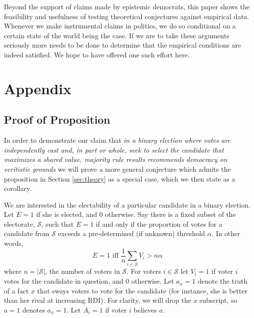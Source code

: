 \documentclass[11pt]{article}
\begin{document}
Beyond the support of claims made by epistemic democrats, this paper shows the feasibility and usefulness of testing theoretical conjectures against empirical data. Whenever we make instrumental claims in politics, we do so conditional on a certain state of the world being the case. If we are to take these arguments seriously more needs to be done to determine that the empirical conditions are indeed satisfied. We hope to have offered one such effort here.



\section{Appendix}
\subsection{Proof of Proposition}


In order to demonstrate our claim that \emph{in a binary election where votes are independently cast and, in part or whole, seek to select the candidate that maximizes a shared value, majority rule results recommends democracy on veritistic grounds} 
we will prove a more general conjecture which admits the proposition in Section \ref{sec:theory} as a special case, which we then state as a corollary. 

We are interested in the electability of a particular candidate in a binary election. Let $E=1$ if she is elected, and 0 otherwise.
Say there is a fixed subset of the electorate, $\mathcal{S}$, such that $E=1$ if and only if the proportion of votes for a candidate from $\mathcal{S}$ exceeds a pre-determined (if unknown) threshold $\alpha$. In other words,
\begin{equation}
E =1 \text{ iff } \frac{1}{n} \sum_{i\in \mathcal{S}} V_i>n\alpha
\end{equation}
where $n=|\mathcal{S}|$, the number of voters in $\mathcal{S}$. 
For voters $i\in \mathcal{S}$ let $V_i=1$ if voter $i$ votes for the candidate in question, and 0 otherwise.
Let $a_x=1$ denote the truth of a fact $x$ that sways voters to vote for the candidate (for instance, she is better than her rival at increasing RDI).
For clarity, we will drop the $x$ subscript, so $a=1$ denotes $a_x=1$.
Let $A_i=1$ if voter $i$ believes $a$.
\end{document}
